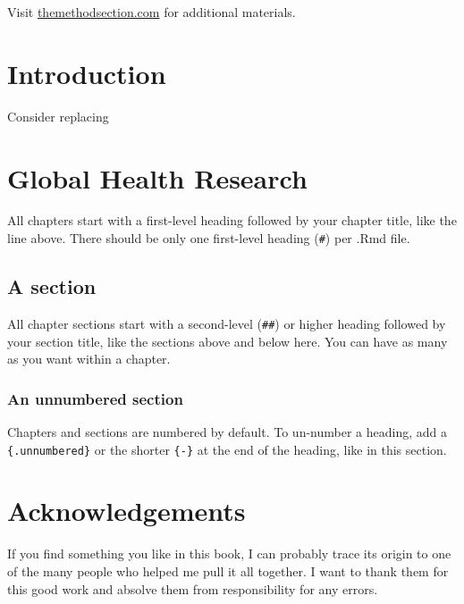 \documentclass[justified,twoside,symmetric,]{tufte-book}
\begin{document}
Visit \href{http://themethodsection.com/}{themethodsection.com} for additional materials.

\hypertarget{introduction}{%
\chapter*{Introduction}\label{introduction}}

Consider replacing

\hypertarget{ghr}{%
\chapter{Global Health Research}\label{ghr}}

All chapters start with a first-level heading followed by your chapter title, like the line above. There should be only one first-level heading (\texttt{\#}) per .Rmd file.

\hypertarget{a-section}{%
\section{A section}\label{a-section}}

All chapter sections start with a second-level (\texttt{\#\#}) or higher heading followed by your section title, like the sections above and below here. You can have as many as you want within a chapter.

\hypertarget{an-unnumbered-section}{%
\subsection*{An unnumbered section}\label{an-unnumbered-section}}

Chapters and sections are numbered by default. To un-number a heading, add a \texttt{\{.unnumbered\}} or the shorter \texttt{\{-\}} at the end of the heading, like in this section.

\hypertarget{acknowledgements}{%
\chapter*{Acknowledgements}\label{acknowledgements}}

If you find something you like in this book, I can probably trace its origin to one of the many people who helped me pull it all together. I want to thank them for this good work and absolve them from responsibility for any errors.
\end{document}
